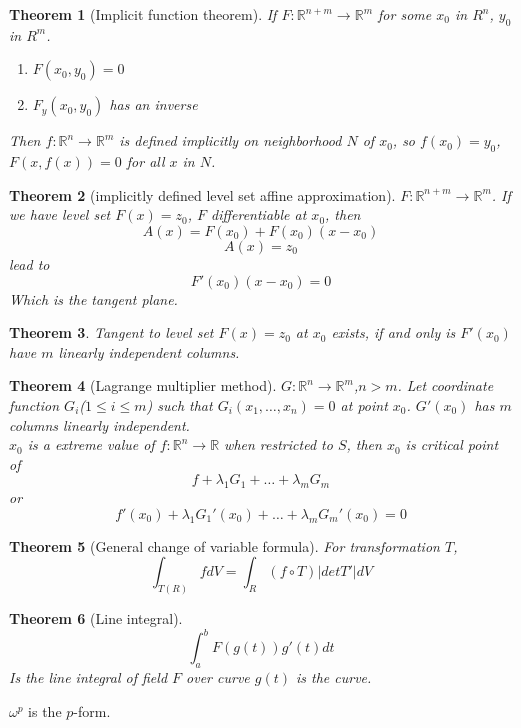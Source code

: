 \documentclass[letter]{article}
\newcommand{\R}{\mathbb{R}}
\newtheorem{theorem}{Theorem}[section]
\newenvironment{definition}[1][Definition]{\begin{trivlist}
\item[\hskip \labelsep {\bfseries #1}]}{\end{trivlist}}
\begin{document}
\begin{theorem}[Implicit function theorem]
If $F:\R^{n+m}\to \R^m$ for some $x_0$ in $R^n$, $y_0$ in $R^m$.
\begin{enumerate}
\item $F(x_0,y_0) = 0$
\item $F_y(x_0,y_0)$ has an inverse
\end{enumerate}
Then $f: \R^n\to \R^m$ is defined implicitly on neighborhood $N$ of $x_0$, so $f(x_0) = y_0$, $F(x,f(x)) = 0$ for all $x$ in $N$.
\end{theorem}

\begin{theorem}[implicitly defined level set affine approximation]
$F:\R^{n+m}\to \R^m$. If we have level set $F(x) = z_0$, $F$ differentiable at $x_0$, then
\[A(x) = F(x_0) + F(x_0)(x-x_0)\]
\[A(x) = z_0\]
lead to
\[ F'(x_0)(x-x_0) = 0\]
Which is the tangent plane.
\end{theorem}

\begin{theorem}
Tangent to level set $F(x) = z_0$ at $x_0$ exists, if and only is $F'(x_0)$ have $m$ linearly independent columns.
\end{theorem}

\begin{theorem}[Lagrange multiplier method]
$G:\R^n\to \R^m$,$n>m$. Let coordinate function $G_i$($1\leq i\leq m$) such that $G_i(x_1,\ldots,x_n)=0$ at point $x_0$. $G'(x_0)$ has $m$ columns linearly independent.\\
$x_0$ is a extreme value of $f:\R^n \to \R$ when restricted to $S$, then $x_0$ is critical point of 
\[f+ \lambda_1 G_1 + \ldots + \lambda_m G_m\]
or
\[f'(x_0)+ \lambda_1 G_1'(x_0) + \ldots + \lambda_m G_m'(x_0) = 0\]
\end{theorem}

\begin{theorem}[General change of variable formula]
For transformation $T$,
\[
\int_{T(R)} f dV = \int_{R} (f \circ T) |det T'| dV
\]
\end{theorem}

\begin{theorem}[Line integral]
\[
\int_a^b F(g(t)) g'(t) dt
\]
Is the line integral of field $F$ over curve $g(t)$ is the curve.
\end{theorem}

\begin{definition}
$\omega^p$ is the $p$-form.
\end{definition}
\end{document}
